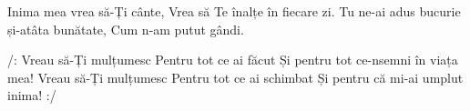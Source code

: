 \beginverse
Inima mea vrea să-Ți cânte,
Vrea să Te înalțe în fiecare zi.
Tu ne-ai adus bucurie și-atâta bunătate,
Cum n-am putut gândi.
\endverse

\beginchorus
/: Vreau să-Ți mulțumesc
Pentru tot ce ai făcut
Și pentru tot ce-nsemni în viața mea!
Vreau să-Ți mulțumesc
Pentru tot ce ai schimbat
Și pentru că mi-ai umplut inima! :/
\endchorus
\endsong